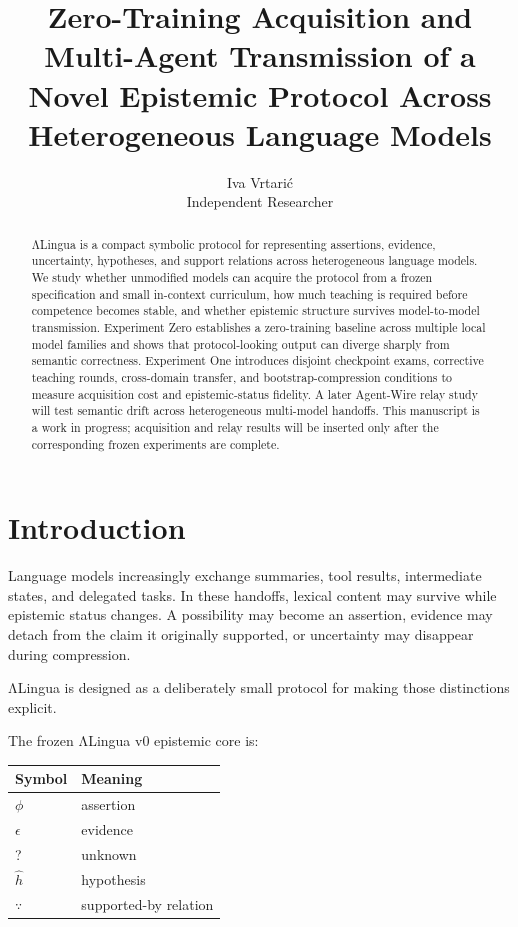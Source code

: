 \documentclass[11pt]{article}
\title{Zero-Training Acquisition and Multi-Agent Transmission of a Novel Epistemic Protocol Across Heterogeneous Language Models}
\author{
  Iva Vrtari\'c \\
  Independent Researcher
}
\date{}
\begin{document}
\maketitle

\begin{abstract}
ΛLingua is a compact symbolic protocol for representing assertions, evidence, uncertainty, hypotheses, and support relations across heterogeneous language models. We study whether unmodified models can acquire the protocol from a frozen specification and small in-context curriculum, how much teaching is required before competence becomes stable, and whether epistemic structure survives model-to-model transmission. Experiment Zero establishes a zero-training baseline across multiple local model families and shows that protocol-looking output can diverge sharply from semantic correctness. Experiment One introduces disjoint checkpoint exams, corrective teaching rounds, cross-domain transfer, and bootstrap-compression conditions to measure acquisition cost and epistemic-status fidelity. A later Agent-Wire relay study will test semantic drift across heterogeneous multi-model handoffs. This manuscript is a work in progress; acquisition and relay results will be inserted only after the corresponding frozen experiments are complete.
\end{abstract}

\section{Introduction}

Language models increasingly exchange summaries, tool results, intermediate states, and delegated tasks. In these handoffs, lexical content may survive while epistemic status changes. A possibility may become an assertion, evidence may detach from the claim it originally supported, or uncertainty may disappear during compression.

ΛLingua is designed as a deliberately small protocol for making those distinctions explicit.

The frozen ΛLingua v0 epistemic core is:

\begin{center}
\begin{tabular}{ll}
\toprule
Symbol & Meaning \\
\midrule
$\phi$ & assertion \\
$\epsilon$ & evidence \\
? & unknown \\
$\hat{h}$ & hypothesis \\
$\because$ & supported-by relation \\
\bottomrule
\end{tabular}
\end{center}
\end{document}
